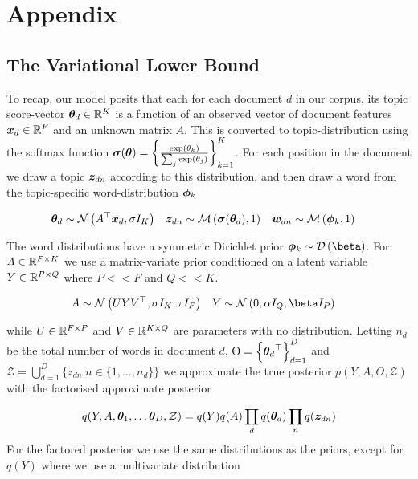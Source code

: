 

\section{Appendix}

\subsection{The Variational Lower Bound}
To recap, our model posits that each for each document $d$ in our corpus, its topic score-vector ${ \bm \theta_d } \in { \mathbb{R}^{K} }$ is a function of an observed vector of document features ${ \bm x_d } \in { \mathbb{R}^{F} }$ and an unknown matrix $A$. This is converted to topic-distribution using the softmax function $\bm \sigma(\bm \theta) = \left\{ \frac{\exp(\theta_k)}{\sum_j \exp(\theta_j)} \right\}_{k=1}^K$. For each position in the document we draw a topic ${ \bm z_{dn} }$ according to this distribution, and then draw a word from the topic-specific word-distribution ${ \bm \phi_k }$

\begin{align}
{  \bm \theta _d } &\sim \mathcal{N} \left( {A^\top{  \bm x _d }}, {\sigma I_K} \right) &
{ \bm z_{dn} } &\sim \mathcal{M} \left( {\bm \sigma({ \bm \theta_d })},{1} \right) & 
{ \bm w_{dn} } &\sim \mathcal{M} \left( {{ \bm \phi_k }},{1} \right)
\end{align}

The word distributions have a symmetric Dirichlet prior $\pk \sim \dir{\vv{\beta}}$. For $A \in { \mathbb{R}^{F \times K} }$ we use a matrix-variate prior conditioned on a latent variable $Y \in { \mathbb{R}^{P \times Q} }$ where $P << F$ and $Q << K$.

\begin{align}
A &\sim \mnor{UYV\T}{\sigma I_K}{\tau I_F} &
Y &\sim \mnor{0}{\alpha I_Q}{\beta I_P}
\end{align}

while $U \in { \mathbb{R}^{F \times P} }$ and $V \in { \mathbb{R}^{K \times Q} }$ are parameters with no distribution. Letting $n_d$ be the total number of words in document $d$, $\Theta = \left\{ { \bm \theta_d }^\top \right\}_{d=1}^D$ and $\mathcal{Z} = \bigcup_{d=1}^D \{ z_{dn} | n \in \{1, \ldots, n_d \} \}$ we approximate the true posterior $p(Y, A, \Theta, \mathcal{Z})$ with the factorised approximate posterior


\begin{align}
q(Y, A, \bm \theta_1, \ldots \bm \theta_D, \mathcal{Z}) = q(Y)q(A)\prod_d q({ \bm \theta_d }) \prod_n q({ \bm z_{dn} })
\end{align}
For the factored posterior we use the same distributions as the priors, except for $q(Y)$ where we use a multivariate distribution

